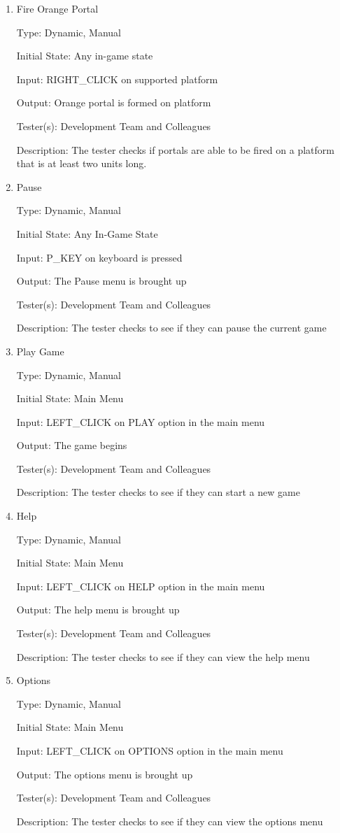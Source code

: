 \documentclass[12pt, titlepage]{article}
\begin{document}
\begin{enumerate}
\item{Fire Orange Portal\\}

Type: Dynamic, Manual

Initial State: Any in-game state

Input: RIGHT\_CLICK on supported platform

Output: Orange portal is formed on platform

Tester(s): Development Team and Colleagues

Description: The tester checks if portals are able to be fired on a platform that is at least two units long.

\item{Pause\\}

Type: Dynamic, Manual

Initial State: Any In-Game State

Input: P\_KEY on keyboard is pressed

Output: The Pause menu is brought up

Tester(s): Development Team and Colleagues

Description: The tester checks to see if they can pause the current game

\item{Play Game\\}

Type: Dynamic, Manual

Initial State: Main Menu

Input: LEFT\_CLICK on PLAY option in the main menu

Output: The game begins

Tester(s): Development Team and Colleagues

Description: The tester checks to see if they can start a new game

\item{Help\\}

Type: Dynamic, Manual

Initial State: Main Menu

Input: LEFT\_CLICK on HELP option in the main menu

Output: The help menu is brought up

Tester(s): Development Team and Colleagues

Description: The tester checks to see if they can view the help menu

\item{Options\\}

Type: Dynamic, Manual

Initial State: Main Menu

Input: LEFT\_CLICK on OPTIONS option in the main menu

Output: The options menu is brought up

Tester(s): Development Team and Colleagues

Description: The tester checks to see if they can view the options menu

\end{enumerate}
\end{document}
